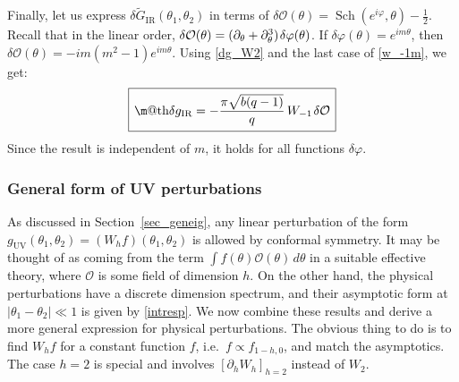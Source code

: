 \documentclass[12pt]{article}
\makeatletter
\newcommand*{\wideboxed}[1]{\setlength{\fboxsep}{1ex}%
  \fbox{\m@th$\displaystyle#1$}}
\newcommand{\calO}{\mathcal{O}}
\DeclareMathOperator{\Sch}{Sch}
\newcommand{\IR}{\text{IR}}
\newcommand{\UV}{\text{UV}}
\newcommand{\tG}{\widetilde{G}}
\newcommand{\OO}{\mathcal{O}}
\newcommand{\vp}{\varphi}
\def\ie{i.e.\ }
\makeatother
\begin{document}
Finally, let us express $\delta\tG_{\IR}(\theta_1,\theta_2)$ in terms of $\delta\calO(\theta)=\Sch(e^{i\vp},\theta)-\frac{1}{2}$. Recall that in the linear order, $\delta\calO(\theta) =(\partial_{\theta}+\partial_{\theta}^3)\kern1pt\delta\vp(\theta)$. If $\delta\vp(\theta)=e^{im\theta}$, then $\delta\calO(\theta)=-im(m^2-1)e^{im\theta}$. Using \eqref{dg_W2} and the last case of \eqref{w_-1m}, we get:
\begin{equation}\label{gIR_O}
\wideboxed{
\delta g_{\IR}=-\frac{\pi\sqrt{b(q-1)}}{q}\, W_{-1}\kern1pt\delta\OO
}
\end{equation}
Since the result is independent of $m$, it holds for all functions $\delta\vp$.

\subsubsection{General form of UV perturbations}

As discussed in Section~\ref{sec_geneig}, any linear perturbation of the form $g_{\UV}(\theta_1,\theta_2)=(W_{h}f)(\theta_1,\theta_2)$ is allowed by conformal symmetry. It may be thought of as coming from the term $\int f(\theta)\calO(\theta)\,d\theta$ in a suitable effective theory, where $\calO$ is some field of dimension $h$. On the other hand, the physical perturbations have a discrete dimension spectrum, and their asymptotic form at $|\theta_1-\theta_2|\ll 1$ is given by \eqref{intresp}. We now combine these results and derive a more general expression for physical perturbations. The obvious thing to do is to find $W_{h}f$ for a constant function $f$, \ie $f\propto f_{1-h,0}$, and match the asymptotics. The case $h=2$ is special and involves $[\partial_{h}W_{h}]_{h=2}$ instead of $W_2$.
\end{document}
